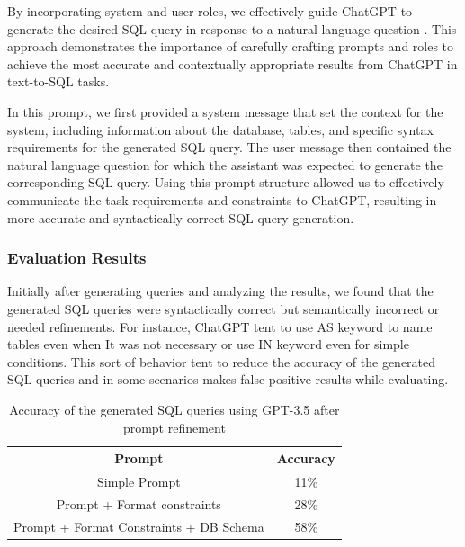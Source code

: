 By incorporating system and user roles, we effectively guide ChatGPT to generate the desired SQL query in response to a natural language question \cite{white2023prompt}. This approach demonstrates the importance of carefully crafting prompts and roles to achieve the most accurate and contextually appropriate results from ChatGPT in text-to-SQL tasks.

In this prompt, we first provided a system message that set the context for the system, including information about the database, tables, and specific syntax requirements for the generated SQL query. The user message then contained the natural language question for which the assistant was expected to generate the corresponding SQL query.
Using this prompt structure allowed us to effectively communicate the task requirements and constraints to ChatGPT, resulting in more accurate and syntactically correct SQL query generation.

\subsubsection{Evaluation Results}

Initially after generating queries and analyzing the results, we found that the generated SQL queries were syntactically correct but semantically incorrect or needed refinements. For instance, ChatGPT tent to use AS keyword to name tables even when It was not necessary or use IN keyword even for simple conditions. This sort of behavior tent to reduce the accuracy of the generated SQL queries and in some scenarios makes false positive results while evaluating.

\begin{table}[H]
    \centering
    \begin{tabular}{c|c}
        \hline
        \textbf{Prompt}                         & \textbf{Accuracy} \\ \hline
        Simple Prompt                           & 11\%              \\ \hline
        Prompt + Format constraints             & 28\%              \\ \hline
        Prompt + Format Constraints + DB Schema & 58\%              \\ \hline
    \end{tabular}
    \caption{Accuracy of the generated SQL queries using GPT-3.5 after prompt refinement}
    \label{tab:prompt-refinement}
\end{table}

